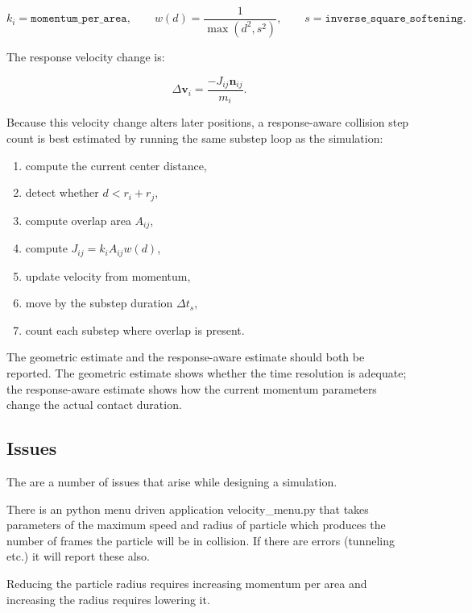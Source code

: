 \documentclass[11pt]{article}
\newcommand{\parnum}{(\arabic{parcount})}
\newcounter{parcount}
\newenvironment{parnumbers}{%
   \par%
   \everypar{\noindent \stepcounter{parcount}\parnum \hspace{1em}}%
}{}
\begin{document}
\[
    k_i = \texttt{momentum\_per\_area},
    \qquad
    w(d)=\frac{1}{\max(d^2,s^2)},
    \qquad
    s=\texttt{inverse\_square\_softening}.
\]

The response velocity change is:

\[
    \Delta \mathbf{v}_i
    =
    \frac{-J_{ij}\mathbf{n}_{ij}}{m_i}.
\]

Because this velocity change alters later positions, a response-aware collision
step count is best estimated by running the same substep loop as the simulation:

\begin{enumerate}
    \item compute the current center distance,
    \item detect whether \(d < r_i+r_j\),
    \item compute overlap area \(A_{ij}\),
    \item compute \(J_{ij}=k_iA_{ij}w(d)\),
    \item update velocity from momentum,
    \item move by the substep duration \(\Delta t_s\),
    \item count each substep where overlap is present.
\end{enumerate}

The geometric estimate and the response-aware estimate should both be reported.
The geometric estimate shows whether the time resolution is adequate; the
response-aware estimate shows how the current momentum parameters change the
actual contact duration.

\subsection{Issues}

The are a number of issues that arise while designing a simulation.

\begin{parnumbers}
There is an python menu driven application velocity\_menu.py that takes parameters of the maximum speed and radius of particle which produces the number of frames the particle will be in collision. If there are errors (tunneling etc.) it will report these also.

Reducing the particle radius requires increasing momentum per area and increasing the radius requires lowering it.

\end{parnumbers}
\end{document}
